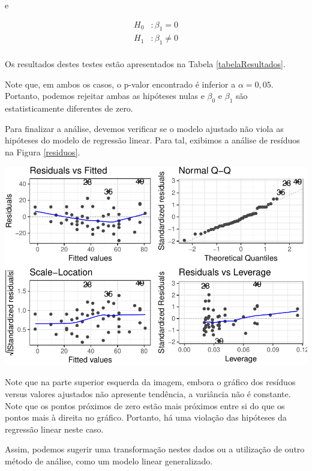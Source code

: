 \documentclass[a5paper,12pt,twoside,printwatermark=true]{modeloLEA}
\numberwithin{equation}{section}
\numberwithin{figure}{section}
\numberwithin{table}{section}
\begin{document}
\noindent e

\begin{align*}
H_0 &: \beta_1 = 0 \\
H_1 &: \beta_1 \neq 0 \\
\end{align*}

\noindent Os resultados destes testes estão apresentados na Tabela
\ref{tabelaResultados}.

Note que, em ambos os casos, o p-valor encontrado é inferior a
\(\alpha = 0,05\). Portanto, podemos rejeitar ambas as hipóteses nulas e
\(\beta_0\) e \(\beta_1\) são estatisticamente diferentes de zero.

Para finalizar a análise, devemos verificar se o modelo ajustado não
viola as hipóteses do modelo de regressão linear. Para tal, exibimos a
análise de resíduos na Figura \ref{residuos}.

\begin{Shaded}
\begin{Highlighting}[]
\end{Highlighting}
\end{Shaded}

\begin{center}\includegraphics{skeleton_files/figure-latex/residuos-1} \end{center}

Note que na parte superior esquerda da imagem, embora o gráfico dos
resíduos versus valores ajustados não apresente tendência, a variância
não é constante. Note que os pontos próximos de zero estão mais próximos
entre si do que os pontos mais à direita no gráfico. Portanto, há uma
violação das hipóteses da regressão linear neste caso.

Assim, podemos sugerir uma transformação nestes dados ou a utilização de
outro método de análise, como um modelo linear generalizado.





\end{document}
